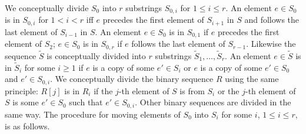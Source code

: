 \documentclass[11pt]{article}\usepackage{fullpage}
\newcommand{\tS}{{\tilde S}}
\begin{document}
We conceptually divide $S_0$ into $r$ substrings $S_{0,i}$ for $1\le i \le r$. An element $e\in S_0$ is in $S_{0,i}$ for $1< i < r$ iff $e$ precedes the first element of $S_{i+1}$ in $S$  and follows the last element of $S_{i-1}$ in $S$. An element $e\in S_0$ is in $S_{0,1}$ if $e$ precedes the first element of $S_2$; $e\in S_0$ is in $S_{0,r}$ if $e$ follows the last element of $S_{r-1}$. 
Likewise the sequence $\tS$ is conceptually divided into $r$ substrings $\tS_1,\ldots,\tS_r$.
An element $e\in \tS$ is in $\tS_i$ for some $i\ge 1$ if $e$ is a copy of some $e'\in S_i$ or $e$ is a copy of some $e'\in S_0$ and $e'\in S_{0,i}$. 
We conceptually divide the binary sequence $R$  using the same principle:  
$R[j]$ is in $R_i$ if the $j$-th element of $S$ is from $S_i$ or the $j$-th element of $S$ is some $e'\in S_0$ such that  $e'\in S_{0,i}$. Other binary sequences are divided in the same way.  The procedure for moving elements of $S_0$ into $S_i$ for some $i$, $1\le i\le r$, is as follows.
\end{document}
